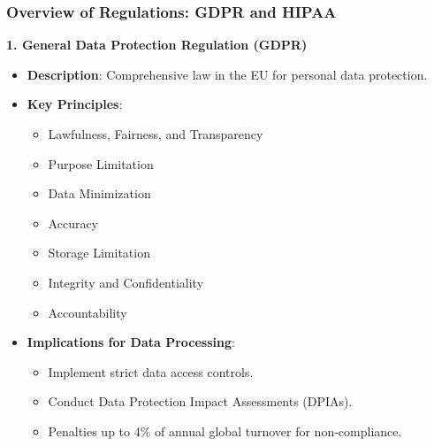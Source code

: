 \documentclass{beamer}
\begin{document}
\begin{frame}[fragile]
    \frametitle{Overview of Regulations: GDPR and HIPAA}

    \textbf{1. General Data Protection Regulation (GDPR)}  
    \begin{itemize}
        \item \textbf{Description}: Comprehensive law in the EU for personal data protection.
        \item \textbf{Key Principles}:
        \begin{itemize}
            \item Lawfulness, Fairness, and Transparency
            \item Purpose Limitation
            \item Data Minimization
            \item Accuracy
            \item Storage Limitation
            \item Integrity and Confidentiality
            \item Accountability
        \end{itemize}
        \item \textbf{Implications for Data Processing}:
        \begin{itemize}
            \item Implement strict data access controls.
            \item Conduct Data Protection Impact Assessments (DPIAs).
            \item Penalties up to 4\% of annual global turnover for non-compliance.
        \end{itemize}
    \end{itemize}
\end{frame}
\end{document}

